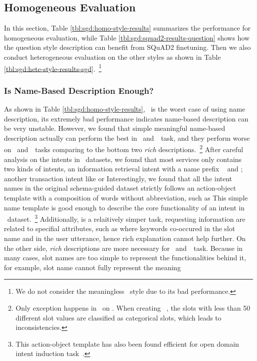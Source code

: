 \subsection{Homogeneous Evaluation}
\label{ssec:sgd:homo-eval}
In this section, Table \ref{tbl:sgd:homo-style-results} summarizes the
performance for homogeneous evaluation, while Table
\ref{tbl:sgd:squad2-results-question} shows how the question style
description can benefit from SQuAD2 finetuning. Then we also conduct
heterogeneous evaluation on the other styles as
shown in Table \ref{tbl:sgd:hete-style-results-sgd}.~\footnote{We do not
  consider the meaningless \ID~style due to its bad performance.}
%
\subsubsection{Is Name-Based Description Enough?}
\label{sssec:sgd:question-name}
As shown in Table \ref{tbl:sgd:homo-style-results}, \ID~is the worst
case of using name description, its extremely bad performance
indicates name-based description can be very unstable. However, we
found that simple meaningful name-based description actually can
perform the best in \IC~and~\RSI~task, and they perform worse on
\CSL~and~\NSL~tasks comparing to the bottom two {\it rich}
descriptions.~\footnote{Only exception happens in \CSL~on
  \multiwoz. When creating \multiwoz~\citep{zang-etal-2020-multiwoz},
  the slots with less than 50 different slot values are classified as
  categorical slots, which leads to inconsistencies.} After careful
analysis on the intents in \sgdst~datasets, we found that most
services only contains two kinds of intents, an information retrieval
intent with a name prefix ~ and
; another transaction intent like 
 or  Interestingly, we found that
all the intent names in the original schema-guided dataset strictly
follows an action-object template with a composition of words without
abbreviation, such as  
This simple name template is good enough to describe the core
functionality of an intent in \sgdst~dataset.~\footnote{This
  action-object template has also been found efficient for open domain
  intent induction task~\citep[\eg, OPINE][]{vedula2020open}.}
Additionally, \RSI is a relaitively simper task, requesting
information are related to specifial attributes, such as
  where keywords
co-occured in the slot name and in the user utterance, hence rich
explanation cannot help further. On the other side, {\it rich}
descriptions are more necessary for \CSL~and~\NSL~task. Because in
many cases, slot names are too simple to represent the functionalities
behind it, for example, slot name  cannot fully represent
the meaning 

